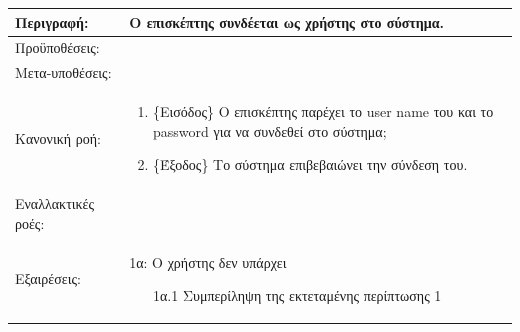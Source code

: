 \documentclass{assignment}
\begin{document}
\begin{longtable}{| p{3.5cm} | p{9cm} |}
\hline
Περιγραφή: &
Ο επισκέπτης συνδέεται ως χρήστης στο σύστημα.\\
\hline
Προϋποθέσεις: &\mbox{}\par\vspace{-\baselineskip}
\\
\hline
Μετα-υποθέσεις: & \\
\hline
Κανονική ροή: &\mbox{}\par\vspace{-\baselineskip}
\begin{enumerate}
\item \{Εισόδος\} Ο επισκέπτης παρέχει το user name του και το password για να συνδεθεί στο σύστημα;
\item \{Έξοδος\} Το σύστημα επιβεβαιώνει την σύνδεση του.
\end{enumerate}\\
\hline
Εναλλακτικές ροές: &\mbox{}\par\vspace{-\baselineskip} 
\\
\hline
Εξαιρέσεις: &\mbox{}\par\vspace{-\baselineskip} 
1α: Ο χρήστης δεν υπάρχει
\begin{enumerate}
\item [1α.1] Συμπερίληψη της εκτεταμένης περίπτωσης 1
\end{enumerate}


\end{longtable}
\end{document}
